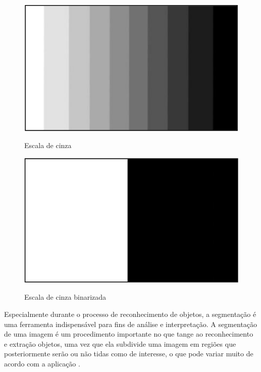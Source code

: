 \begin{figure}[h!]
    \centering
    \caption{Escala de cinza}
    \includegraphics[scale=0.25]{figuras/escala_cinza.png} 
    \fonte{}%
    \label{fig:escalacinza}
    \centering
\end{figure}

\begin{figure}[h!]
    \centering
    \caption{Escala de cinza binarizada}
    \includegraphics[scale=0.25]{figuras/escala_binarizada.png} 
    \fonte{}%
    \label{fig:escalabinarizada}
    \centering
\end{figure}

Especialmente durante o processo de reconhecimento de objetos, 
a segmentação é uma ferramenta indispensável para fins de análise e interpretação.
A segmentação de uma imagem é um procedimento importante no que tange
ao reconhecimento e extração objetos, uma vez que ela subdivide uma imagem em regiões que
posteriormente serão ou não tidas como de interesse, o que pode variar muito de
acordo com a aplicação \cite{gonzalez2010}.

